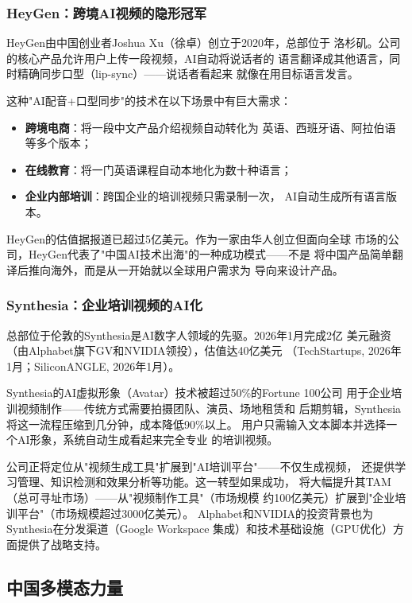 \subsubsection{HeyGen：跨境AI视频的隐形冠军}
HeyGen由中国创业者Joshua Xu（徐卓）创立于2020年，总部位于
洛杉矶。公司的核心产品允许用户上传一段视频，AI自动将说话者的
语言翻译成其他语言，同时精确同步口型（lip-sync）——说话者看起来
就像在用目标语言发言。

这种"AI配音+口型同步"的技术在以下场景中有巨大需求：
\begin{itemize}
  \item \textbf{跨境电商}：将一段中文产品介绍视频自动转化为
    英语、西班牙语、阿拉伯语等多个版本；
  \item \textbf{在线教育}：将一门英语课程自动本地化为数十种语言；
  \item \textbf{企业内部培训}：跨国企业的培训视频只需录制一次，
    AI自动生成所有语言版本。
\end{itemize}

HeyGen的估值据报道已超过5亿美元。作为一家由华人创立但面向全球
市场的公司，HeyGen代表了"中国AI技术出海"的一种成功模式——不是
将中国产品简单翻译后推向海外，而是从一开始就以全球用户需求为
导向来设计产品。

\subsubsection{Synthesia：企业培训视频的AI化}
总部位于伦敦的Synthesia是AI数字人领域的先驱。2026年1月完成2亿
美元融资（由Alphabet旗下GV和NVIDIA领投），估值达40亿美元
（TechStartups, 2026年1月；SiliconANGLE, 2026年1月）。

Synthesia的AI虚拟形象（Avatar）技术被超过50\%的Fortune 100公司
用于企业培训视频制作——传统方式需要拍摄团队、演员、场地租赁和
后期剪辑，Synthesia将这一流程压缩到几分钟，成本降低90\%以上。
用户只需输入文本脚本并选择一个AI形象，系统自动生成看起来完全专业
的培训视频。

公司正将定位从"视频生成工具"扩展到"AI培训平台"——不仅生成视频，
还提供学习管理、知识检测和效果分析等功能。这一转型如果成功，
将大幅提升其TAM（总可寻址市场）——从"视频制作工具"（市场规模
约100亿美元）扩展到"企业培训平台"（市场规模超过3000亿美元）。
Alphabet和NVIDIA的投资背景也为Synthesia在分发渠道（Google Workspace
集成）和技术基础设施（GPU优化）方面提供了战略支持。

\subsection{中国多模态力量}
\label{subsec:china-multimodal}

